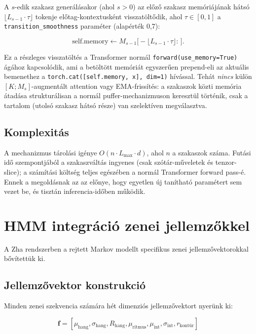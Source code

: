 A $s$-edik szakasz generálásakor (ahol $s > 0$) az előző szakasz memóriájának hátsó $\lfloor L_{s-1} \cdot \tau \rfloor$ tokenje előtag-kontextusként visszatöltődik, ahol $\tau \in [0, 1]$ a \texttt{transition\_smoothness} paraméter (alapérték 0,7):

\begin{equation}
\text{self.memory} \leftarrow M_{s-1}\bigl[-\lfloor L_{s-1} \cdot \tau \rfloor : \,\bigr].
\end{equation}

Ez a részleges visszatöltés a Transformer normál \texttt{forward(use\_memory=True)} ágához kapcsolódik, ami a betöltött memóriát egyszerűen prepend-eli az aktuális bemenethez a \texttt{torch.cat([self.memory, x], dim=1)} hívással. Tehát \emph{nincs} külön $[K; M_s]$-augmentált attention vagy EMA-frissítés: a szakaszok közti memória átadása strukturálisan a normál puffer-mechanizmuson keresztül történik, csak a tartalom (utolsó szakasz hátsó része) van szelektíven megválasztva.

\subsection{Komplexitás}

A mechanizmus tárolási igénye $O(n \cdot L_{\max} \cdot d)$, ahol $n$ a szakaszok száma. Futási idő szempontjából a szakaszváltás ingyenes (csak szótár-műveletek és tenzor-slice); a számítási költség teljes egészében a normál Transformer forward pass-é. Ennek a megoldásnak az az előnye, hogy egyetlen új tanítható paramétert sem vezet be, és tisztán inferencia-időben működik.

\section{HMM integráció zenei jellemzőkkel}
\label{proof:hmm_features}

A Zha rendszerben a rejtett Markov modellt specifikus zenei jellemzővektorokkal bővítettük ki.

\subsection{Jellemzővektor konstrukció}

Minden zenei szekvencia számára hét dimenziós jellemzővektort nyerünk ki:

\begin{equation}
\mathbf{f} = [\mu_{\text{hang}}, \sigma_{\text{hang}}, R_{\text{hang}}, \mu_{\text{ritmus}}, \mu_{\text{int}}, \sigma_{\text{int}}, r_{\text{kontúr}}]
\end{equation}

